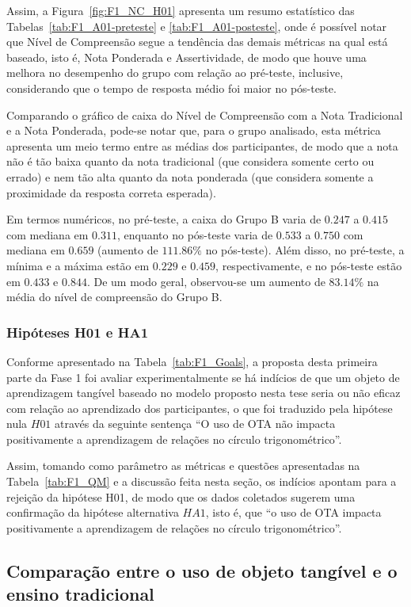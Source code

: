 Assim, a Figura~\ref{fig:F1_NC_H01} apresenta um resumo estatístico das Tabelas~\ref{tab:F1_A01-preteste} e \ref{tab:F1_A01-posteste}, onde é possível notar que Nível de Compreensão segue a tendência das demais métricas na qual está baseado, isto é, Nota Ponderada e Assertividade, de modo que houve uma melhora no desempenho do grupo com relação ao pré-teste, inclusive, considerando que o tempo de resposta médio foi maior no pós-teste.

Comparando o gráfico de caixa do Nível de Compreensão com a Nota Tradicional e a Nota Ponderada, pode-se notar que, para o grupo analisado, esta métrica apresenta um meio termo entre as médias dos participantes, de modo que a nota não é tão baixa quanto da nota tradicional (que considera somente certo ou errado) e nem tão alta quanto da nota ponderada (que considera somente a proximidade da resposta correta esperada).

Em termos numéricos, no pré-teste, a caixa do Grupo B varia de $0.247$ a $0.415$ com mediana em $0.311$, enquanto no pós-teste varia de $0.533$ a $0.750$ com mediana em $0.659$ (aumento de $111.86\%$ no pós-teste). Além disso, no pré-teste, a mínima e a máxima estão em $0.229$ e $0.459$, respectivamente, e no pós-teste estão em $0.433$ e $0.844$. De um modo geral, observou-se um aumento de $83.14\%$ na média do nível de compreensão do Grupo B.

\subsubsection{Hipóteses H01 e HA1}

Conforme apresentado na Tabela~\ref{tab:F1_Goals}, a proposta desta primeira parte da Fase 1 foi avaliar experimentalmente se há indícios de que um objeto de aprendizagem tangível baseado no modelo proposto nesta tese seria ou não eficaz com relação ao aprendizado dos participantes, o que foi traduzido pela hipótese nula $H01$ através da seguinte sentença ``O uso de OTA não impacta positivamente a aprendizagem de relações no círculo trigonométrico''.

Assim, tomando como parâmetro as métricas e questões apresentadas na Tabela~\ref{tab:F1_QM} e a discussão feita nesta seção, os indícios apontam para a rejeição da hipótese H01, de modo que os dados coletados sugerem uma confirmação da hipótese alternativa $HA1$, isto é, que ``o uso de OTA impacta positivamente a aprendizagem de relações no círculo trigonométrico''.

\subsection{Comparação entre o uso de objeto tangível e o ensino tradicional}\label{subsec:fase1-H02}

